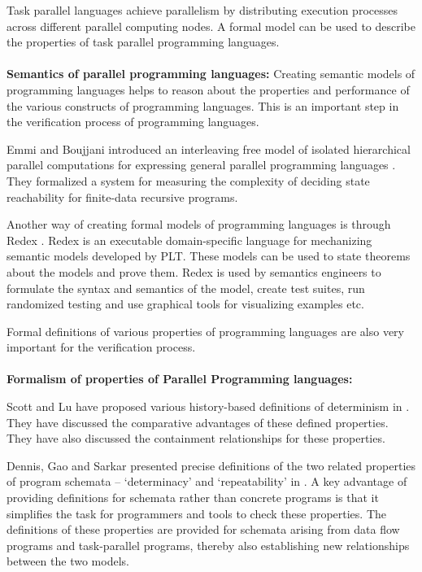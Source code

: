 Task parallel languages achieve parallelism by distributing execution processes across different parallel computing nodes. A formal model can be used to describe the properties of task parallel programming languages. 
\\
\\
\textbf{Semantics of parallel programming languages:}
Creating semantic models of programming languages helps to reason about the properties and performance of the various constructs of programming languages. This is an important step in the verification process of programming languages.

Emmi and Boujjani introduced an interleaving free model of isolated hierarchical parallel computations for expressing general parallel programming languages \cite{bouajjani2012analysis}. They formalized a system for measuring the complexity of deciding state reachability for finite-data recursive programs.

Another way of creating formal models of programming languages is through Redex \cite{klein2012run}. Redex is an executable domain-specific language for mechanizing semantic models developed by PLT. These models can be used to state theorems about the models and prove them. Redex is used by semantics engineers to formulate the syntax and semantics of the model, create test suites, run randomized testing and use graphical tools for visualizing examples etc.

Formal definitions of various properties of programming languages are also very important for the verification process.
\\
\\
\textbf{Formalism of properties of Parallel Programming languages:}

Scott and Lu have proposed various history-based definitions of determinism in \cite{lu2011toward}. They have discussed the comparative advantages of these defined properties. They have also discussed the containment relationships for these properties.

Dennis, Gao and Sarkar presented precise definitions of the two related properties of program schemata – ‘determinacy’ and ‘repeatability’ in \cite{dennis2012determinacy}. A key advantage of providing definitions for schemata rather than concrete programs is that it simplifies the task for programmers and tools to check these properties. The definitions of these properties are provided for schemata arising from data flow programs and task-parallel programs, thereby also establishing new relationships between the two models.

